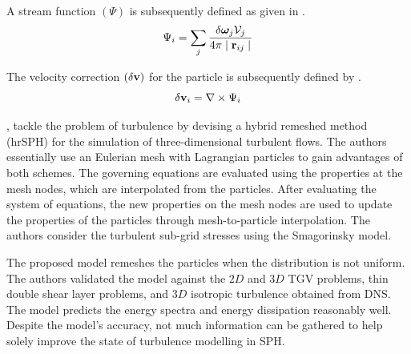 A stream function $(\Psi)$ is subsequently defined as given in .
\begin{equation}
    \Psi_i = \sum_j \frac{\delta \Vorticity_j \Vol_j}{4\pi \RtwoIJ[]}
    \label{eq:Liu2019-stream-func}
\end{equation}

The velocity correction $(\delta \mathbf{v})$ for the particle is subsequently defined by .
\begin{equation}
    \delta \vect{v}_i = \nabla \times \Psi_i
    \label{eq:Liu2019-vel-update}
\end{equation}

\cite{Obeidat2018}, tackle the problem of turbulence by devising a hybrid remeshed method (hrSPH)
for the simulation of three-dimensional turbulent flows. 
The authors essentially use an Eulerian mesh with Lagrangian particles to gain advantages of both schemes. The governing equations are evaluated using the properties at the mesh nodes, which are interpolated from the particles. After evaluating the system of equations, the new properties on the mesh nodes are used to update the properties of the particles through mesh-to-particle interpolation. The authors consider the turbulent sub-grid stresses using the Smagorinsky model.

The proposed model remeshes the particles when the distribution is not uniform. The authors validated the model against the $2D$ and $3D$ TGV problems, thin double shear layer problems, and $3D$ isotropic turbulence obtained from DNS. The model predicts the energy spectra and energy dissipation reasonably well. Despite the model’s accuracy, not much information can be gathered to help solely improve the state of turbulence modelling in SPH.